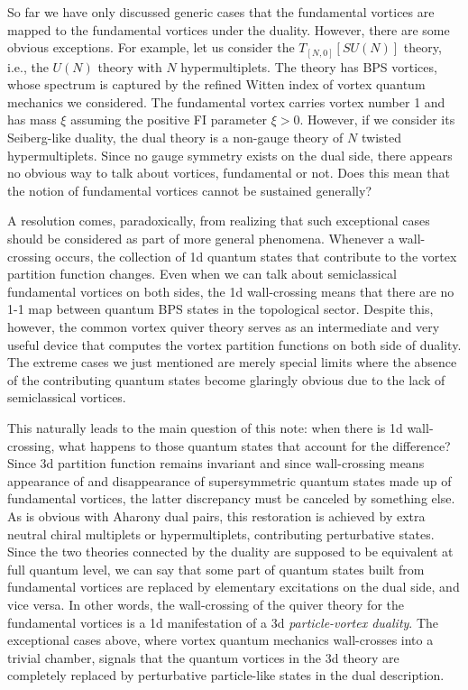 \documentclass[a4paper,11pt]{article}
\begin{document}
So far we have only discussed generic cases that the fundamental vortices are mapped to the fundamental vortices under the duality. However, there are some obvious exceptions. For example, let us consider the $T_{[N,0]} [SU(N)]$ theory, i.e., the $U(N)$ theory with $N$ hypermultiplets. The theory has BPS vortices, whose spectrum is captured by the refined Witten index of vortex quantum mechanics we considered. The fundamental vortex carries vortex number 1 and has mass $\xi$ assuming the positive FI parameter $\xi > 0$. However, if we consider its Seiberg-like duality, the dual theory is a non-gauge theory of $N$ twisted hypermultiplets. Since no gauge symmetry exists on the dual side, there appears no obvious way to talk about vortices, fundamental or not. Does this mean
that the notion of fundamental vortices cannot be sustained generally?

A resolution comes, paradoxically, from realizing that such exceptional cases should be considered as part of more general phenomena. Whenever a wall-crossing occurs, the collection of 1d quantum states that contribute to the vortex partition function changes. Even when we can talk about semiclassical fundamental vortices on both sides, the 1d wall-crossing means that there are no 1-1 map between quantum BPS states in the topological sector. Despite this, however, the common vortex quiver theory serves as an intermediate and very useful device that computes the vortex partition functions on both side of duality. The extreme cases we just mentioned are merely special limits where the absence of the contributing quantum states become glaringly obvious due to the lack of semiclassical vortices.

This naturally leads to the main question of this note: when there is 1d wall-crossing, what happens to those quantum states that account for the difference? Since 3d partition function remains invariant and since wall-crossing means appearance of and disappearance of supersymmetric quantum states made up of fundamental vortices, the latter discrepancy must be canceled by something else. As is obvious with Aharony dual pairs, this restoration is achieved by extra neutral chiral multiplets or hypermultiplets, contributing perturbative states. Since the two theories connected by the duality are supposed to be equivalent at full quantum level, we can say that some part of quantum states built from fundamental vortices are replaced by elementary excitations on the dual side, and vice versa. In other words, the wall-crossing of the quiver theory for the fundamental vortices is a 1d manifestation of a 3d {\it particle-vortex duality}.  The exceptional cases above, where vortex quantum mechanics wall-crosses into a trivial chamber, signals that the quantum vortices in the 3d theory are completely replaced by perturbative particle-like states in the dual description.
\end{document}
